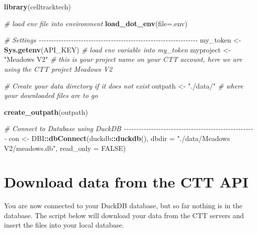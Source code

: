 \documentclass[
]{book}
\newenvironment{Shaded}{\begin{snugshade}}{\end{snugshade}}
\newcommand{\AttributeTok}[1]{\textcolor[rgb]{0.13,0.29,0.53}{#1}}
\newcommand{\CommentTok}[1]{\textcolor[rgb]{0.56,0.35,0.01}{\textit{#1}}}
\newcommand{\ConstantTok}[1]{\textcolor[rgb]{0.56,0.35,0.01}{#1}}
\newcommand{\FunctionTok}[1]{\textcolor[rgb]{0.13,0.29,0.53}{\textbf{#1}}}
\newcommand{\NormalTok}[1]{#1}
\newcommand{\OtherTok}[1]{\textcolor[rgb]{0.56,0.35,0.01}{#1}}
\newcommand{\SpecialCharTok}[1]{\textcolor[rgb]{0.81,0.36,0.00}{\textbf{#1}}}
\newcommand{\StringTok}[1]{\textcolor[rgb]{0.31,0.60,0.02}{#1}}
\begin{document}
\begin{Shaded}
\begin{Highlighting}[]
\FunctionTok{library}\NormalTok{(celltracktech)}

\CommentTok{\# load env file into environment}
\FunctionTok{load\_dot\_env}\NormalTok{(}\AttributeTok{file=}\StringTok{\textquotesingle{}.env\textquotesingle{}}\NormalTok{)}

\CommentTok{\# Settings {-}{-}{-}{-}{-}{-}{-}{-}{-}{-}{-}{-}{-}{-}{-}{-}{-}{-}{-}{-}{-}{-}{-}{-}{-}{-}{-}{-}{-}{-}{-}{-}{-}{-}{-}{-}{-}{-}{-}{-}{-}{-}{-}{-}{-}{-}{-}{-}{-}{-}{-}{-}{-}{-}{-}{-}{-}{-}{-}{-}{-}{-}{-}{-}}
\NormalTok{my\_token }\OtherTok{\textless{}{-}} \FunctionTok{Sys.getenv}\NormalTok{(}\StringTok{\textquotesingle{}API\_KEY\textquotesingle{}}\NormalTok{) }\CommentTok{\# load env variable into my\_token}
\NormalTok{myproject }\OtherTok{\textless{}{-}} \StringTok{"Meadows V2"} \CommentTok{\# this is your project name on your CTT account, here we are using the CTT project \textquotesingle{}Meadows V2\textquotesingle{}}

\CommentTok{\# Create your data directory if it does not exist}
\NormalTok{outpath }\OtherTok{\textless{}{-}} \StringTok{"./data/"} \CommentTok{\# where your downloaded files are to go}

\FunctionTok{create\_outpath}\NormalTok{(outpath)}

\CommentTok{\# Connect to Database using DuckDB {-}{-}{-}{-}{-}{-}{-}{-}{-}{-}{-}{-}{-}{-}{-}{-}{-}{-}{-}{-}{-}{-}{-}{-}{-}{-}{-}{-}{-}{-}{-}{-}{-}{-}{-}{-}{-}{-}{-}{-}{-}{-}{-}{-}{-}{-}{-}{-}{-}{-}{-}{-}{-}}
\NormalTok{con }\OtherTok{\textless{}{-}}\NormalTok{ DBI}\SpecialCharTok{::}\FunctionTok{dbConnect}\NormalTok{(duckdb}\SpecialCharTok{::}\FunctionTok{duckdb}\NormalTok{(), }
                      \AttributeTok{dbdir =} \StringTok{"./data/Meadows V2/meadows.db"}\NormalTok{, }
                      \AttributeTok{read\_only =} \ConstantTok{FALSE}\NormalTok{)}
\end{Highlighting}
\end{Shaded}

\section{Download data from the CTT API}\label{download-data-from-the-ctt-api}

You are now connected to your DuckDB database, but so far nothing is in the database. The script below will download your data from the CTT servers and insert the files into your local database.
\end{document}
